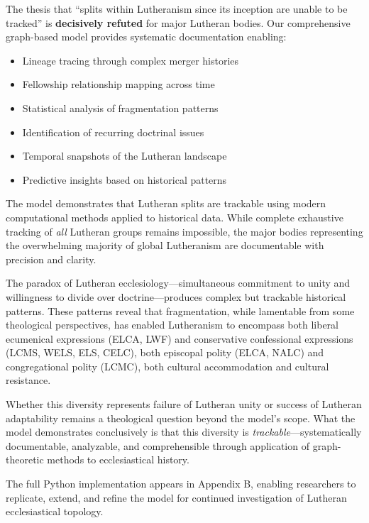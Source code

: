 The thesis that ``splits within Lutheranism since its inception are unable to be tracked'' is \textbf{decisively refuted} for major Lutheran bodies. Our comprehensive graph-based model provides systematic documentation enabling:

\begin{itemize}
\item Lineage tracing through complex merger histories
\item Fellowship relationship mapping across time
\item Statistical analysis of fragmentation patterns
\item Identification of recurring doctrinal issues
\item Temporal snapshots of the Lutheran landscape
\item Predictive insights based on historical patterns
\end{itemize}

The model demonstrates that Lutheran splits are trackable using modern computational methods applied to historical data. While complete exhaustive tracking of \textit{all} Lutheran groups remains impossible, the major bodies representing the overwhelming majority of global Lutheranism are documentable with precision and clarity.

The paradox of Lutheran ecclesiology---simultaneous commitment to unity and willingness to divide over doctrine---produces complex but trackable historical patterns. These patterns reveal that fragmentation, while lamentable from some theological perspectives, has enabled Lutheranism to encompass both liberal ecumenical expressions (ELCA, LWF) and conservative confessional expressions (LCMS, WELS, ELS, CELC), both episcopal polity (ELCA, NALC) and congregational polity (LCMC), both cultural accommodation and cultural resistance.

Whether this diversity represents failure of Lutheran unity or success of Lutheran adaptability remains a theological question beyond the model's scope. What the model demonstrates conclusively is that this diversity is \textit{trackable}---systematically documentable, analyzable, and comprehensible through application of graph-theoretic methods to ecclesiastical history.

The full Python implementation appears in Appendix B, enabling researchers to replicate, extend, and refine the model for continued investigation of Lutheran ecclesiastical topology.

